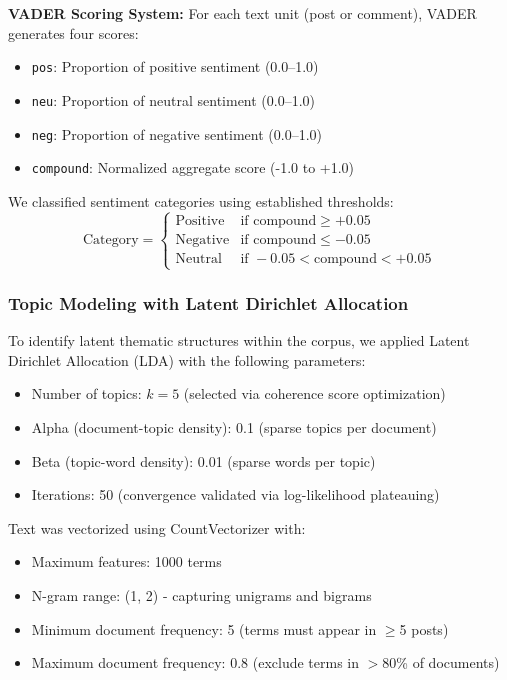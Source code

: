 \documentclass[12pt, a4paper]{article}
\begin{document}
\textbf{VADER Scoring System:}
For each text unit (post or comment), VADER generates four scores:
\begin{itemize}
    \item \texttt{pos}: Proportion of positive sentiment (0.0--1.0)
    \item \texttt{neu}: Proportion of neutral sentiment (0.0--1.0)
    \item \texttt{neg}: Proportion of negative sentiment (0.0--1.0)
    \item \texttt{compound}: Normalized aggregate score (-1.0 to +1.0)
\end{itemize}

We classified sentiment categories using established thresholds:
\begin{equation}
    \text{Category} = \begin{cases}
        \text{Positive} & \text{if compound} \geq +0.05 \\
        \text{Negative} & \text{if compound} \leq -0.05 \\
        \text{Neutral} & \text{if } -0.05 < \text{compound} < +0.05
    \end{cases}
\end{equation}

\subsubsection{Topic Modeling with Latent Dirichlet Allocation}
To identify latent thematic structures within the corpus, we applied Latent Dirichlet Allocation (LDA) with the following parameters:
\begin{itemize}
    \item Number of topics: $k = 5$ (selected via coherence score optimization)
    \item Alpha (document-topic density): 0.1 (sparse topics per document)
    \item Beta (topic-word density): 0.01 (sparse words per topic)
    \item Iterations: 50 (convergence validated via log-likelihood plateauing)
\end{itemize}

Text was vectorized using CountVectorizer with:
\begin{itemize}
    \item Maximum features: 1000 terms
    \item N-gram range: (1, 2) - capturing unigrams and bigrams
    \item Minimum document frequency: 5 (terms must appear in $\geq$5 posts)
    \item Maximum document frequency: 0.8 (exclude terms in $>$80\% of documents)
\end{itemize}
\end{document}
